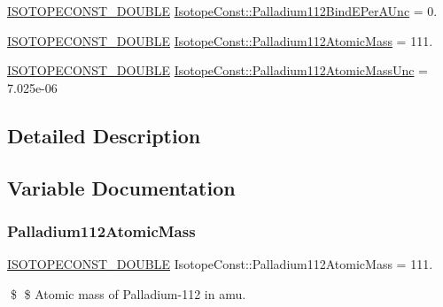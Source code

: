 \begin{DoxyCompactItemize}
\mbox{\hyperlink{group___isotope_const-_macros_ga8f45a7272ce02c0b4c65c44636ed719a}{I\+S\+O\+T\+O\+P\+E\+C\+O\+N\+S\+T\+\_\+\+D\+O\+U\+B\+LE}} \mbox{\hyperlink{group___isotope_const-_palladium-_pd112_ga1ad4acda597a319189d89476f7c5c0e0}{Isotope\+Const\+::\+Palladium112\+Bind\+E\+Per\+A\+Unc}} = 0.
\item 
\mbox{\hyperlink{group___isotope_const-_macros_ga8f45a7272ce02c0b4c65c44636ed719a}{I\+S\+O\+T\+O\+P\+E\+C\+O\+N\+S\+T\+\_\+\+D\+O\+U\+B\+LE}} \mbox{\hyperlink{group___isotope_const-_palladium-_pd112_ga199ea4d85d622f89907cb0e8b2f3e608}{Isotope\+Const\+::\+Palladium112\+Atomic\+Mass}} = 111.
\item 
\mbox{\hyperlink{group___isotope_const-_macros_ga8f45a7272ce02c0b4c65c44636ed719a}{I\+S\+O\+T\+O\+P\+E\+C\+O\+N\+S\+T\+\_\+\+D\+O\+U\+B\+LE}} \mbox{\hyperlink{group___isotope_const-_palladium-_pd112_gafa99df6127bae684d272c2f7536c2c04}{Isotope\+Const\+::\+Palladium112\+Atomic\+Mass\+Unc}} = 7.\+025e-\/06
\end{DoxyCompactItemize}


\subsection{Detailed Description}


\subsection{Variable Documentation}
\mbox{\label{group___isotope_const-_palladium-_pd112_ga199ea4d85d622f89907cb0e8b2f3e608}} 
\subsubsection{\texorpdfstring{Palladium112\+Atomic\+Mass}{Palladium112AtomicMass}}
{\footnotesize\ttfamily \mbox{\hyperlink{group___isotope_const-_macros_ga8f45a7272ce02c0b4c65c44636ed719a}{I\+S\+O\+T\+O\+P\+E\+C\+O\+N\+S\+T\+\_\+\+D\+O\+U\+B\+LE}} Isotope\+Const\+::\+Palladium112\+Atomic\+Mass = 111.}

\$ \$ Atomic mass of Palladium-\/112 in amu. \mbox{\label{group___isotope_const-_palladium-_pd112_gafa99df6127bae684d272c2f7536c2c04}} 
